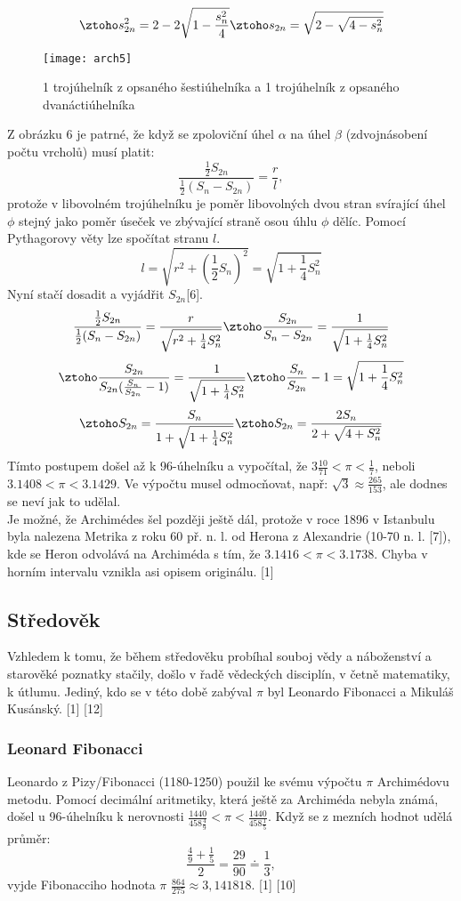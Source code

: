 \documentclass[rocnikovka]{gzwroc} %
\begin{document}
\begin{equation}
\ztoho s_{2n}^2=2-2\sqrt{1-\frac{s_n^2}{4}} \ztoho s_{2n}=\sqrt{2-\sqrt{4-s_n^2}}
\end{equation}
\begin{figure}[!ht]
\texttt{[image: arch5]}
\caption{1 trojúhelník z opsaného šestiúhelníka a 1 trojúhelník z opsaného dvanáctiúhelníka}
\label{fig:kruh}
\end{figure}
Z obrázku 6 je patrné, že když se zpoloviční úhel $\alpha$ na úhel $\beta$ (zdvojnásobení počtu vrcholů) musí platit:
$$
\frac{\frac{1}{2}S_{2n}}{\frac{1}{2}(S_n-S_{2n})}=\frac{r}{l},
$$
protože v libovolném trojúhelníku je poměr libovolných dvou stran svírající úhel $\phi$ stejný jako poměr úseček ve zbývající straně osou úhlu $\phi$ dělíc. Pomocí Pythagorovy věty lze spočítat stranu $l$.
$$
l=\sqrt{r^2+\left(\frac{1}{2}S_n\right)^2}=\sqrt{1+\frac{1}{4}S_n^2}
$$
Nyní stačí dosadit a vyjádřit $S_{2n}$[6].
$$
\frac{\frac{1}{2}S_{2n}}{\frac{1}{2}(S_n-S_{2n})}=\frac{r}{\sqrt{r^2+\frac{1}{4}S^2_n}} \ztoho \frac{S_{2n}}{S_n-S_{2n}}=\frac{1}{\sqrt{1+\frac{1}{4}S^2_n}}
$$
$$
\ztoho \frac{S_{2n}}{S_{2n}(\frac{S_n}{S_{2n}}-1)}=\frac{1}{\sqrt{1+\frac{1}{4}S^2_n}} \ztoho \frac{S_n}{S_{2n}}-1=\sqrt{1+\frac{1}{4}S^2_n}
$$
\begin{equation}
\ztoho S_{2n}=\frac{S_n}{1+\sqrt{1+\frac{1}{4}S^2_n}} \ztoho S_{2n}=\frac{2S_n}{2+\sqrt{4+S^2_n}} 
\end{equation}
Tímto postupem došel až k 96-úhelníku a vypočítal, že $3\frac{10}{71}<\pi <\frac{1}{7}$, neboli $3.1408<\pi <3.1429$. Ve výpočtu musel odmocňovat, např: $\sqrt{3}\approx \frac{265}{153}$, ale dodnes se neví jak to udělal.\\
Je možné, že Archimédes šel později ještě dál, protože v roce 1896 v Istanbulu byla nalezena Metrika z roku 60 př. n. l. od Herona z Alexandrie (10-70 n. l. [7]), kde se Heron odvolává na Archiméda s tím, že $3.1416<\pi <3.1738$. Chyba v horním intervalu vznikla asi opisem originálu. [1]
\subsection{Středověk}
Vzhledem k tomu, že během středověku probíhal souboj vědy a náboženství a starověké poznatky stačily, došlo v řadě vědeckých disciplín, v četně matematiky, k útlumu. Jediný, kdo se v této době zabýval $\pi$ byl Leonardo Fibonacci a Mikuláš Kusánský. [1] [12]
\subsubsection{Leonard Fibonacci}
Leonardo z Pizy/Fibonacci (1180-1250) použil ke svému výpočtu $\pi$ Archimédovu metodu. Pomocí decimální aritmetiky, která ještě za Archiméda nebyla známá, došel u 96-úhelníku k nerovnosti $\frac{1440}{458\frac{4}{9}}<\pi<\frac{1440}{458\frac{1}{5}}$. Když se z mezních hodnot udělá průměr:
$$
\frac{\frac{4}{9}+\frac{1}{5}}{2}=\frac{29}{90}\doteq\frac{1}{3},
$$
vyjde Fibonacciho hodnota $\pi$ $\frac{864}{275}\approx 3,141818$. [1] [10]
\end{document}
